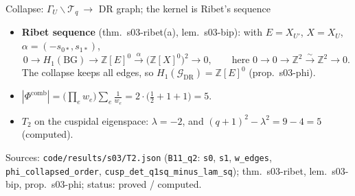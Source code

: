 \begin{frame}{Collapse: $\Gamma_U\backslash\mathcal T_q\ \to$ DR graph; the kernel is Ribet's sequence}
  \vspace{-1mm}
  \begin{itemize}\small
    \item \textbf{Ribet sequence} (thm.\ s03-ribet(a), lem.\ s03-bip): with $E=X_{U'}$, $X=X_U$, $\alpha=(-s_{0*},s_{1*})$,
      \[0\to H_1(\mathrm{BG})\to \mathbb Z[E]^0\xrightarrow{\ \alpha\ }\big(\mathbb Z[X]^0\big)^2\to 0,
        \qquad \text{here } 0\to 0\to\mathbb Z^2\xrightarrow{\ \sim\ }\mathbb Z^2\to 0 .\]
      The collapse keeps all edges, so $H_1(\mathcal G_{\mathrm{DR}})=\mathbb Z[E]^0$ (prop.\ s03-phi).
    \item $|\Phi^{\mathrm{comb}}|=\big(\prod_e w_e\big)\sum_e \tfrac1{w_e}=2\cdot\big(\tfrac12+1+1\big)=5$.
    \item $T_2$ on the cuspidal eigenspace: $\lambda=-2$, and $(q+1)^2-\lambda^2=9-4=5$ (computed).
  \end{itemize}
  \vfill
  {\tiny Sources: \texttt{code/results/s03/T2.json} (\texttt{B11\_q2}: \texttt{s0}, \texttt{s1}, \texttt{w\_edges}, \texttt{phi\_collapsed\_order}, \texttt{cusp\_det\_q1sq\_minus\_lam\_sq}); thm.\ s03-ribet, lem.\ s03-bip, prop.\ s03-phi; status: proved / computed.}
\end{frame}
